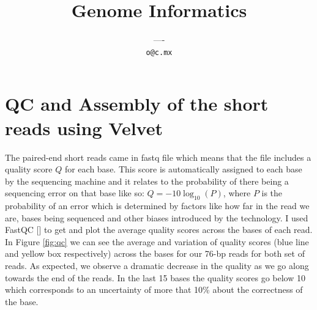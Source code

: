 \documentclass[a4paper,12pt]{article}
\author{----\\ \texttt{o@c.mx}}
\title{Genome Informatics}
\begin{document}
\maketitle
\section{QC and Assembly of the short reads using Velvet}
The paired-end short reads came in fastq file which means that the
file includes a quality score $Q$ for each base.  This score is
automatically assigned to each base by the sequencing machine and it
relates to the probability of there being a sequencing error on that
base like so: $Q = -10 \log_{10} (P)$, where $P$ is the probability of
an error which is determined by factors like how far in the read we
are, bases being sequenced and other biases introduced by the
technology.
I used FastQC
[\cite{andrews2010fastqc}] to get and plot the average quality scores
across the bases of each read.  In Figure \ref{fig:qc} we can see the
average and variation of quality scores (blue line and yellow box
respectively) across the bases for our 76-bp reads for both set of
reads. As expected, we observe a dramatic decrease in the quality as
we go along towards the end of the reads. In the last 15 bases the
quality scores go below 10 which corresponds to an uncertainty of more
that 10\% about the correctness of the base.
\end{document}
